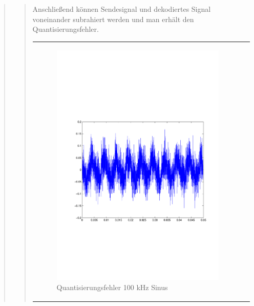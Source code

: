 \begin{quote}
\begin{quote}
    	
    	
	   	Anschließend können Sendesignal und dekodiertes Signal voneinander subrahiert werden und man erhält den
	   	Quantisierungsfehler.\\
	   	
	   	\begin{center}
            \begin{tabular}{ll}
            
            \hspace{-5cm}
                \begin{minipage}{0.6\textwidth}
                    \begin{figure}[H]
                        \includegraphics[scale=0.55, trim = 16mm 70mm 16mm 85mm, clip]{Bilder/100kHz_sin_Quantisierungsfehler}
                          \caption{Quantisierungsfehler 100 kHz Sinus}
		                  \label{fig:QuantErr 100 kHz Sinus}
                    \end{figure}
                \end{minipage}
                

\end{tabular}
\end{center}
\end{quote}
\end{quote}
